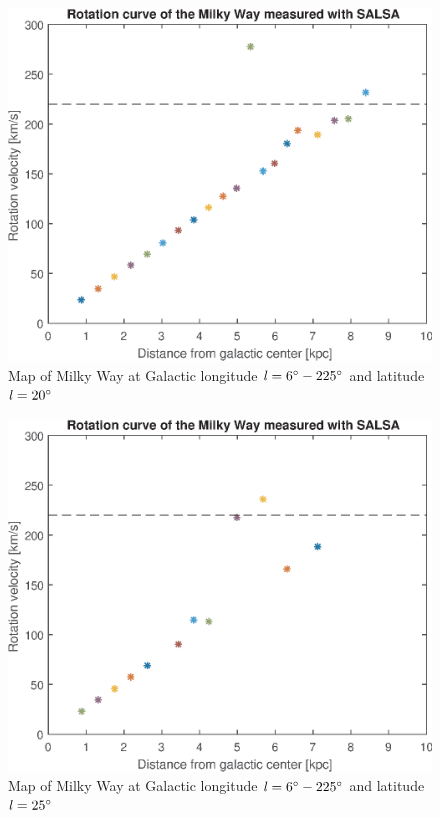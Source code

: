 \documentclass[fleqn,usenatbib]{mnras}
\begin{document}
\begin{figure}
      \includegraphics[width=\columnwidth]{RotationCurve_5}
      \caption{Map of Milky Way at Galactic longitude $\mathit{l}=6\hbox{$^\circ$}-225\hbox{$^\circ$}$ and latitude $\mathit{l}=20\hbox{$^\circ$}$}
      \label{fig:rot-5}
\end{figure}

\begin{figure}
      \includegraphics[width=\columnwidth]{RotationCurve_6}
      \caption{Map of Milky Way at Galactic longitude $\mathit{l}=6\hbox{$^\circ$}-225\hbox{$^\circ$}$ and latitude $\mathit{l}=25\hbox{$^\circ$}$}
      \label{fig:rot-6}
\end{figure}
\end{document}
